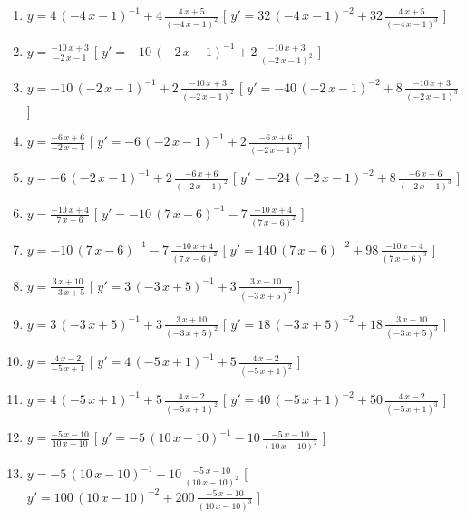 \begin{esercizio}
\begin{enumerate}
\item $y= 4\, \left( -4\,x-1 \right) ^{-1}+4\,{\frac {4\,x+5}{ \left( -4\,x-1 \right) ^{2}}} $ \hfill [ $y'= 32\, \left( -4\,x-1 \right) ^{-2}+32\,{\frac {4\,x+5}{ \left( -4\,x-1 \right) ^{3}}}$ ]
\item $y= {\frac {-10\,x+3}{-2\,x-1}} $ \hfill [ $y'= -10\, \left( -2\,x-1 \right) ^{-1}+2\,{\frac {-10\,x+3}{ \left( -2\,x-1 \right) ^{2}}}$ ]
\item $y= -10\, \left( -2\,x-1 \right) ^{-1}+2\,{\frac {-10\,x+3}{ \left( -2\,x-1 \right) ^{2}}} $ \hfill [ $y'= -40\, \left( -2\,x-1 \right) ^{-2}+8\,{\frac {-10\,x+3}{ \left( -2\,x-1 \right) ^{3}}}$ ]
\item $y= {\frac {-6\,x+6}{-2\,x-1}} $ \hfill [ $y'= -6\, \left( -2\,x-1 \right) ^{-1}+2\,{\frac {-6\,x+6}{ \left( -2\,x-1 \right) ^{2}}}$ ]
\item $y= -6\, \left( -2\,x-1 \right) ^{-1}+2\,{\frac {-6\,x+6}{ \left( -2\,x-1 \right) ^{2}}} $ \hfill [ $y'= -24\, \left( -2\,x-1 \right) ^{-2}+8\,{\frac {-6\,x+6}{ \left( -2\,x-1 \right) ^{3}}}$ ]
\item $y= {\frac {-10\,x+4}{7\,x-6}} $ \hfill [ $y'= -10\, \left( 7\,x-6 \right) ^{-1}-7\,{\frac {-10\,x+4}{ \left( 7\,x-6 \right) ^{2}}}$ ]
\item $y= -10\, \left( 7\,x-6 \right) ^{-1}-7\,{\frac {-10\,x+4}{ \left( 7\,x-6 \right) ^{2}}} $ \hfill [ $y'= 140\, \left( 7\,x-6 \right) ^{-2}+98\,{\frac {-10\,x+4}{ \left( 7\,x-6 \right) ^{3}}}$ ]
\item $y= {\frac {3\,x+10}{-3\,x+5}} $ \hfill [ $y'= 3\, \left( -3\,x+5 \right) ^{-1}+3\,{\frac {3\,x+10}{ \left( -3\,x+5 \right) ^{2}}}$ ]
\item $y= 3\, \left( -3\,x+5 \right) ^{-1}+3\,{\frac {3\,x+10}{ \left( -3\,x+5 \right) ^{2}}} $ \hfill [ $y'= 18\, \left( -3\,x+5 \right) ^{-2}+18\,{\frac {3\,x+10}{ \left( -3\,x+5 \right) ^{3}}}$ ]
\item $y= {\frac {4\,x-2}{-5\,x+1}} $ \hfill [ $y'= 4\, \left( -5\,x+1 \right) ^{-1}+5\,{\frac {4\,x-2}{ \left( -5\,x+1 \right) ^{2}}}$ ]
\item $y= 4\, \left( -5\,x+1 \right) ^{-1}+5\,{\frac {4\,x-2}{ \left( -5\,x+1 \right) ^{2}}} $ \hfill [ $y'= 40\, \left( -5\,x+1 \right) ^{-2}+50\,{\frac {4\,x-2}{ \left( -5\,x+1 \right) ^{3}}}$ ]
\item $y= {\frac {-5\,x-10}{10\,x-10}} $ \hfill [ $y'= -5\, \left( 10\,x-10 \right) ^{-1}-10\,{\frac {-5\,x-10}{ \left( 10\,x-10 \right) ^{2}}}$ ]
\item $y= -5\, \left( 10\,x-10 \right) ^{-1}-10\,{\frac {-5\,x-10}{ \left( 10\,x-10 \right) ^{2}}} $ \hfill [ $y'= 100\, \left( 10\,x-10 \right) ^{-2}+200\,{\frac {-5\,x-10}{ \left( 10\,x-10 \right) ^{3}}}$ ]

\end{enumerate}
\end{esercizio}
